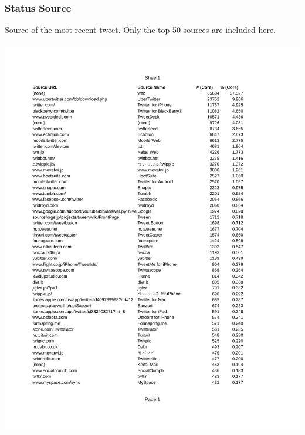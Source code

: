 \onecolumn
\subsubsection{Status Source}
Source of the most recent tweet.  Only the top 50 sources are included here.\\\\
\includegraphics[width=6in,bb=0 0 612 792,keepaspectratio=true]{./sources.pdf}

\twocolumn
